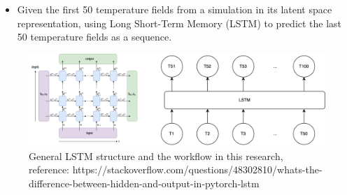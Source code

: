 {\begin{itemize}
    \item Given the first 50 temperature fields from a simulation in its latent space representation, using Long Short-Term Memory (LSTM) to predict the last 50 temperature fields as a sequence.
     
\end{itemize}

\begin{figure}[H]
    \centering
    \includegraphics[width=0.8\linewidth]{figures/LSTM_workflow.png}
    \caption{General LSTM structure and the workflow in this research, reference: https://stackoverflow.com/questions/48302810/whats-the-difference-between-hidden-and-output-in-pytorch-lstm}
\end{figure}
}


